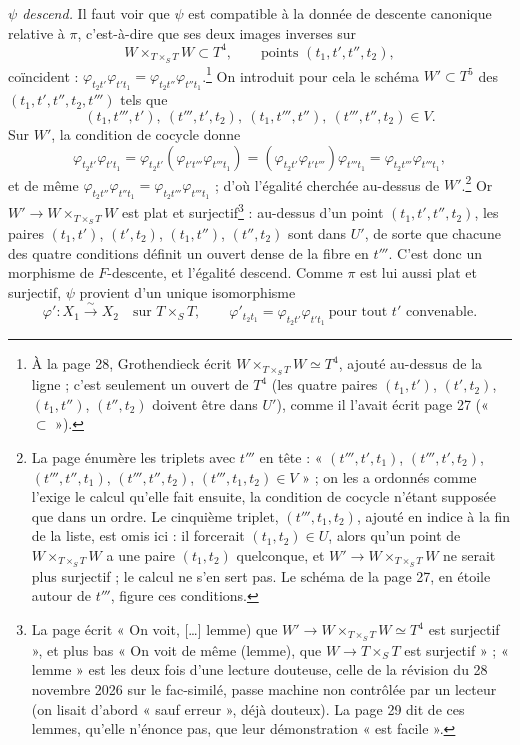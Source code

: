 \documentclass[11pt,a4paper]{article}
\begin{document}
\emph{$\psi$ descend.} Il faut voir que $\psi$ est compatible à la donnée de
descente canonique relative à $\pi$, c'est-à-dire que ses deux images inverses
sur
\[
  W \times_{T \times_S T} W \subset T^{4} , \qquad \text{points } (t_1, t',
  t'', t_2) ,
\]
coïncident : $\varphi_{t_2 t'}\varphi_{t' t_1} = \varphi_{t_2
t''}\varphi_{t'' t_1}$.\footnote{À la page 28, Grothendieck écrit $W
\times_{T \times_S T} W \simeq T^{4}$, ajouté au-dessus de la ligne ; c'est
seulement un ouvert de $T^{4}$ (les quatre paires $(t_1, t')$, $(t', t_2)$,
$(t_1, t'')$, $(t'', t_2)$ doivent être dans $U'$), comme il l'avait écrit
page 27 (« $\subset$ »).} On introduit pour cela le schéma $W' \subset T^{5}$
des $(t_1, t', t'', t_2, t''')$ tels que
\[
  (t_1, t''', t'),\ (t''', t', t_2),\ (t_1, t''', t''),\ (t''', t'', t_2) \in V .
\]
Sur $W'$, la condition de cocycle donne
\[
  \varphi_{t_2 t'}\varphi_{t' t_1}
  = \varphi_{t_2 t'}(\varphi_{t' t'''}\varphi_{t''' t_1})
  = (\varphi_{t_2 t'}\varphi_{t' t'''})\varphi_{t''' t_1}
  = \varphi_{t_2 t'''}\varphi_{t''' t_1} ,
\]
et de même $\varphi_{t_2 t''}\varphi_{t'' t_1} = \varphi_{t_2
t'''}\varphi_{t''' t_1}$ ; d'où l'égalité cherchée au-dessus de
$W'$.\footnote{La page énumère les triplets avec $t'''$ en tête : « $(t''',
t', t_1)$, $(t''', t', t_2)$, $(t''', t'', t_1)$, $(t''', t'', t_2)$,
$(t''', t_1, t_2) \in V$ » ; on les a ordonnés comme l'exige le calcul qu'elle
fait ensuite, la condition de cocycle n'étant supposée que dans un ordre. Le
cinquième triplet, $(t''', t_1, t_2)$, ajouté en indice à la fin de la liste,
est omis ici : il forcerait $(t_1, t_2) \in U$, alors qu'un point de $W
\times_{T \times_S T} W$ a une paire $(t_1, t_2)$ quelconque, et $W' \to W
\times_{T \times_S T} W$ ne serait plus surjectif ; le calcul ne s'en sert pas.
Le schéma de la page 27, en étoile autour de $t'''$, figure ces conditions.}
Or $W' \to W \times_{T \times_S T} W$ est plat et surjectif\footnote{La page
écrit « On voit, […] lemme) que $W' \to W \times_{T \times_S T} W \simeq T^4$ est
surjectif », et plus bas « On voit de même (lemme), que $W \to T \times_S T$ est
surjectif » ; « lemme » est les deux fois d'une lecture douteuse, celle de la
révision du 28 novembre 2026 sur le fac-similé, passe machine non contrôlée par un lecteur (on lisait d'abord « sauf erreur », déjà douteux). La page 29 dit de ces
lemmes, qu'elle n'énonce pas, que leur démonstration « est facile ».} : au-dessus d'un point $(t_1, t', t'', t_2)$, les
paires $(t_1, t')$, $(t', t_2)$, $(t_1, t'')$, $(t'', t_2)$ sont dans $U'$, de
sorte que chacune des quatre conditions définit un ouvert dense de la fibre en
$t'''$. C'est donc un morphisme de $F$-descente, et l'égalité descend. Comme $\pi$ est lui aussi plat et surjectif, $\psi$ provient d'un
unique isomorphisme
\[
  \varphi' : X_1 \xrightarrow{\sim} X_2 \quad \text{sur } T \times_S T ,
  \qquad \varphi'_{t_2 t_1} = \varphi_{t_2 t'}\varphi_{t' t_1} \ \text{pour tout
  } t' \text{ convenable.}
\]
\end{document}
